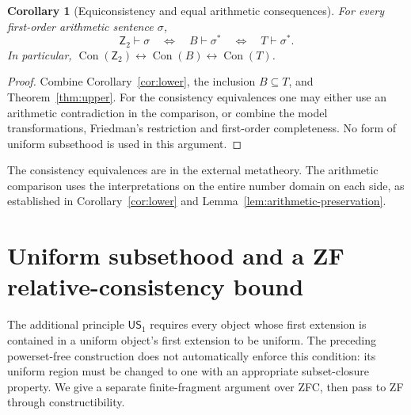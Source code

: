 \documentclass[11pt,a4paper]{article}
\numberwithin{equation}{section}
\newtheorem{corollary}[theorem]{Corollary}
\theoremstyle{definition}
\theoremstyle{remark}
\newcommand{\Ztwo}{\mathsf{Z}_2}
\newcommand{\US}{\mathsf{US}_1}
\newcommand{\Con}{\operatorname{Con}}
\begin{document}
\begin{corollary}[Equiconsistency and equal arithmetic consequences]\label{cor:exact}
For every first-order arithmetic sentence $\sigma$,
\[\Ztwo\vdash\sigma\quad\Longleftrightarrow\quad B\vdash\sigma^*
\quad\Longleftrightarrow\quad T\vdash\sigma^* .\]
In particular, $\Con(\Ztwo)\leftrightarrow\Con(B)\leftrightarrow\Con(T)$.
\end{corollary}
\begin{proof}
Combine Corollary~\ref{cor:lower}, the inclusion $B\subseteq T$, and Theorem~\ref{thm:upper}. For the consistency equivalences one may either use an arithmetic contradiction in the comparison, or combine the model transformations, Friedman's restriction and first-order completeness. No form of uniform subsethood is used in this argument.
\end{proof}
The consistency equivalences are in the external metatheory. The arithmetic comparison uses the interpretations on the entire number domain on each side, as established in Corollary~\ref{cor:lower} and Lemma~\ref{lem:arithmetic-preservation}.

\section{Uniform subsethood and a ZF relative-consistency bound}\label{sec:rank}
The additional principle $\US$ requires every object whose first extension is contained in a uniform object's first extension to be uniform. The preceding powerset-free construction does not automatically enforce this condition: its uniform region must be changed to one with an appropriate subset-closure property. We give a separate finite-fragment argument over ZFC, then pass to ZF through constructibility.
\end{document}
